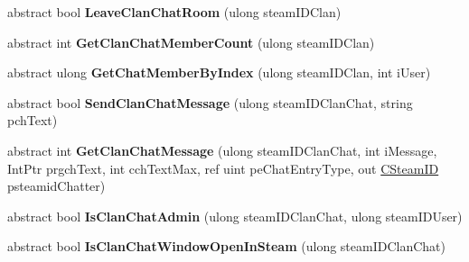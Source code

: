 \begin{DoxyCompactItemize}
\mbox{\label{class_valve_1_1_steamworks_1_1_i_steam_friends_ace7ab33ed48f15ff62d00e3b33afc9e9}} 
abstract bool {\bfseries Leave\+Clan\+Chat\+Room} (ulong steam\+I\+D\+Clan)
\item 
\mbox{\label{class_valve_1_1_steamworks_1_1_i_steam_friends_ac3924de42bcfcc7cad220f7b21460027}} 
abstract int {\bfseries Get\+Clan\+Chat\+Member\+Count} (ulong steam\+I\+D\+Clan)
\item 
\mbox{\label{class_valve_1_1_steamworks_1_1_i_steam_friends_a3002ae2b9693346e5e7eda7d2e56db4f}} 
abstract ulong {\bfseries Get\+Chat\+Member\+By\+Index} (ulong steam\+I\+D\+Clan, int i\+User)
\item 
\mbox{\label{class_valve_1_1_steamworks_1_1_i_steam_friends_a1f71b465ec0fa060139e06bdc6f23b7d}} 
abstract bool {\bfseries Send\+Clan\+Chat\+Message} (ulong steam\+I\+D\+Clan\+Chat, string pch\+Text)
\item 
\mbox{\label{class_valve_1_1_steamworks_1_1_i_steam_friends_aeb5c60ce5e9d3ef7eeee033461815e83}} 
abstract int {\bfseries Get\+Clan\+Chat\+Message} (ulong steam\+I\+D\+Clan\+Chat, int i\+Message, Int\+Ptr prgch\+Text, int cch\+Text\+Max, ref uint pe\+Chat\+Entry\+Type, out \hyperlink{struct_valve_1_1_steamworks_1_1_c_steam_i_d}{C\+Steam\+ID} psteamid\+Chatter)
\item 
\mbox{\label{class_valve_1_1_steamworks_1_1_i_steam_friends_a45be3e0de258f8b43734a966b1322ae3}} 
abstract bool {\bfseries Is\+Clan\+Chat\+Admin} (ulong steam\+I\+D\+Clan\+Chat, ulong steam\+I\+D\+User)
\item 
\mbox{\label{class_valve_1_1_steamworks_1_1_i_steam_friends_a183e79b5adb5081320798453d62d098d}} 
abstract bool {\bfseries Is\+Clan\+Chat\+Window\+Open\+In\+Steam} (ulong steam\+I\+D\+Clan\+Chat)
\item 
\mbox{\label{class_valve_1_1_steamworks_1_1_i_steam_friends_a8bde4c823088e6bd4d08774be62e4ad7}} 

\end{DoxyCompactItemize}
